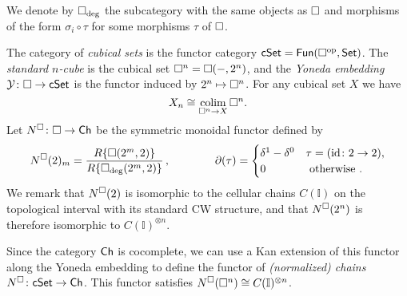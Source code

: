 We denote by $\mathbf{\square}_{\deg}$ the subcategory with the same objects as $\mathbf{\square}$ and morphisms of the form $\sigma_i \circ \tau$ for some morphisms $\tau$ of $\mathbf{\square}$.

The category of \textit{cubical sets} is the functor category $\mathsf{cSet} = \mathsf{Fun}(\mathbf{\square}^{\mathrm{op}}, \mathsf{Set})$.
The \textit{standard $n$-cube} is the cubical set $\mathbf{\square}^n = \mathbf{\square}(-, 2^n)$, and the \textit{Yoneda embedding} $\mathcal{Y} \colon \mathbf{\square} \to \mathsf{cSet}$ is the functor induced by $2^n \mapsto \mathbf{\square}^n$.
For any cubical set $X$ we have
\begin{equation*}
X_n \cong \operatorname*{colim}_{\mathbf{\square}^n \to X} \mathbf{\square}^n.
\end{equation*}
Let $N^{{\footnotesize \square}} \colon \mathbf{\square} \to \mathsf{Ch}$ be the symmetric monoidal functor defined by
\begin{equation*}
N^{{\footnotesize \square}}(2)_m =
\frac{R\{\mathbf{\square}(2^m, 2)\}}{R\{\mathbf{\square}_{\deg}(2^m, 2)\}}\,,
\qquad \qquad
\partial (\tau) =
\begin{cases}
\delta^1 - \delta^0 & \tau  = (\mathrm{id} \colon 2 \to 2), \\
0 & \text{ otherwise }.
\end{cases}
\end{equation*}
We remark that $N^{{\footnotesize \square}}(2)$ is isomorphic to the cellular chains $C(\mathbb I)$ on the topological interval with its standard CW structure, and that $N^{{\footnotesize \square}}(2^n)$ is therefore isomorphic to $C(\mathbb I)^{\otimes n}$. 

Since the category $\mathsf{Ch}$ is cocomplete, we can use a Kan extension of this functor along the Yoneda embedding to define the functor of \textit{(normalized) chains} $N^{{\footnotesize \square}} \colon \mathsf{cSet} \to \mathsf{Ch}$. This functor satisfies $N^{{\footnotesize \square}}(\mathbf{\square}^n) \cong C(\mathbb I)^{\otimes n}$.

